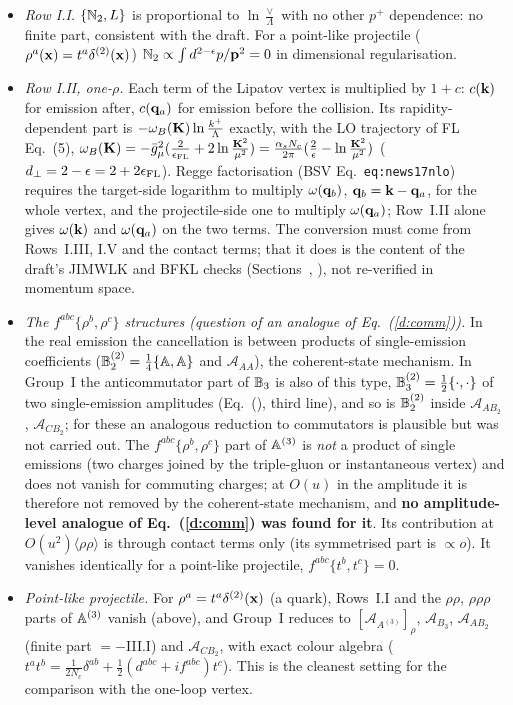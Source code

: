 \begin{itemize}
\item \emph{Row I.I.} $\{\mathbb{N}_2,L\}$ is proportional to $\ln\frac{\vee}{\Lambda}$ with no other $p^+$ dependence: no finite part, consistent with the draft. For a point-like projectile ($\rho^a(\mathbf{x})=t^a\delta^{(2)}(\mathbf{x})$) $\mathbb{N}_2\propto\int d^{2-\epsilon}p/\mathbf{p}^2=0$ in dimensional regularisation.
\item \emph{Row I.II, one-$\rho$.} Each term of the Lipatov vertex is multiplied by $1+c$: $c(\mathbf{k})$ for emission after, $c(\mathbf{q}_a)$ for emission before the collision. Its rapidity-dependent part is $-\omega_B(\mathbf{K})\ln\frac{k^+}{\Lambda}$ exactly, with the LO trajectory of FL Eq.~(5), $\omega_B(\mathbf{K})=-\bar g^2_\mu(\frac{2}{\epsilon_{\rm FL}}+2\ln\frac{\mathbf{K}^2}{\mu^2})=\frac{\alpha_sN_c}{2\pi}(\frac2\epsilon-\ln\frac{\mathbf{K}^2}{\mu^2})$ ($d_\perp=2-\epsilon=2+2\epsilon_{\rm FL}$). Regge factorisation (BSV Eq.~\texttt{eq:news17nlo}) requires the target-side logarithm to multiply $\omega(\mathbf{q}_b)$, $\mathbf{q}_b=\mathbf{k}-\mathbf{q}_a$, for the whole vertex, and the projectile-side one to multiply $\omega(\mathbf{q}_a)$; Row~I.II alone gives $\omega(\mathbf{k})$ and $\omega(\mathbf{q}_a)$ on the two terms. The conversion must come from Rows~I.III, I.V and the contact terms; that it does is the content of the draft's JIMWLK and BFKL checks (Sections~, ), not re-verified in momentum space.
\item \emph{The $f^{abc}\{\rho^b,\rho^c\}$ structures (question of an analogue of Eq.~(\ref{d:comm})).} In the real emission the cancellation is between products of single-emission coefficients ($\mathbb{B}_2^{(2)}=\frac14\{\mathbb{A},\mathbb{A}\}$ and $\mathcal A_{AA}$), the coherent-state mechanism. In Group~I the anticommutator part of $\mathbb{B}_3$ is also of this type, $\mathbb{B}_3^{(2)}=\frac12\{\cdot,\cdot\}$ of two single-emission amplitudes (Eq.~(), third line), and so is $\mathbb{B}_2^{(2)}$ inside $\mathcal A_{AB_2}$, $\mathcal A_{CB_2}$; for these an analogous reduction to commutators is plausible but was not carried out. The $f^{abc}\{\rho^b,\rho^c\}$ part of $\mathbb{A}^{(3)}$ is \emph{not} a product of single emissions (two charges joined by the triple-gluon or instantaneous vertex) and does not vanish for commuting charges; at $O(u)$ in the amplitude it is therefore not removed by the coherent-state mechanism, and \textbf{no amplitude-level analogue of Eq.~(\ref{d:comm}) was found for it}. Its contribution at $O(u^2)\langle\rho\rho\rangle$ is through contact terms only (its symmetrised part is $\propto o$). It vanishes identically for a point-like projectile, $f^{abc}\{t^b,t^c\}=0$.
\item \emph{Point-like projectile.} For $\rho^a=t^a\delta^{(2)}(\mathbf{x})$ (a quark), Rows~I.I and the $\rho\rho$, $\rho\rho\rho$ parts of $\mathbb{A}^{(3)}$ vanish (above), and Group~I reduces to $[\mathcal A_{A^{(3)}}]_\rho$, $\mathcal A_{B_3}$, $\mathcal A_{AB_2}$ (finite part $=-$III.I) and $\mathcal A_{CB_2}$, with exact colour algebra ($t^at^b=\frac{1}{2N_c}\delta^{ab}+\frac12(d^{abc}+if^{abc})t^c$). This is the cleanest setting for the comparison with the one-loop vertex.
\end{itemize}
